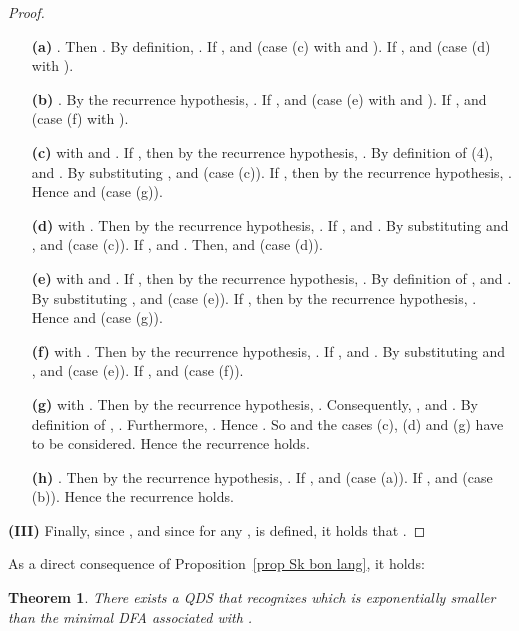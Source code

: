 \documentclass[11pt]{elsarticle}
\newtheorem{theorem}{Theorem}
\newcommand\modif[2]{{#2}}
\begin{document}
\begin{proof}
  \begin{itemize}
    \item[\textbf{(a)}] .  Then  . By definition, .
    If ,  and  (case (c) with  and ).
    If ,  and  (case (d) with ).
\item[\textbf{(b)}] . By \modif{}{the} recurrence hypothesis, . If ,  and  (case (e) with  and ).
    If ,  and  (case (f) with ).
\item[\textbf{(c)}]  with  and . If , then by \modif{}{the} recurrence hypothesis, .  By definition of  (4),   and . 
    By substituting ,  and  (case (c)).
If , then by \modif{}{the} recurrence hypothesis, . Hence  and  (case (g)).
\item[\textbf{(d)}]  with .  Then by \modif{}{the} recurrence hypothesis, . If ,  and . By substituting  and ,  and  (case (c)).
    If ,  and . Then,  and  (case (d)).   \item[\textbf{(e)}]   with  and .  If , then by \modif{}{the} recurrence hypothesis, . 
By definition of ,  and . By substituting ,  and  (case (e)).
If , then by \modif{}{the} recurrence hypothesis, . Hence  and  (case (g)).
\item[\textbf{(f)}]   with .  Then by \modif{}{the} recurrence hypothesis, . If ,  and . By substituting  and ,  and  (case (e)).
If ,  and  (case (f)).
\item[\textbf{(g)}]   with . 
    Then by \modif{}{the} recurrence hypothesis, . 
    Consequently, ,  and .
    By definition of , .
Furthermore, .
    Hence . So  and the cases (c), (d) and (g) have to be considered.
Hence \modif{}{the} recurrence holds. 


    \item[\textbf{(h)}] .  Then by \modif{}{the} recurrence hypothesis, . 
    If ,  and  (case (a)). 
    If ,  and  (case (b)). 
    Hence \modif{}{the} recurrence holds. 
  \end{itemize}
  


  \textbf{(III)} Finally, since , and since for any ,  is defined, it holds that   .
  
\end{proof}

\modif{}{As a direct consequence of Proposition~\ref{prop Sk bon lang}, it holds:}
\begin{theorem}\label{thm qds expo smaller}
  There exists a QDS  that recognizes  which is exponentially smaller than the minimal DFA associated with .
\end{theorem}
\modif{\begin{proof}
  Corollary of Proposition~\ref{prop Sk bon lang}.
  
\end{proof}}{}
\end{document}
